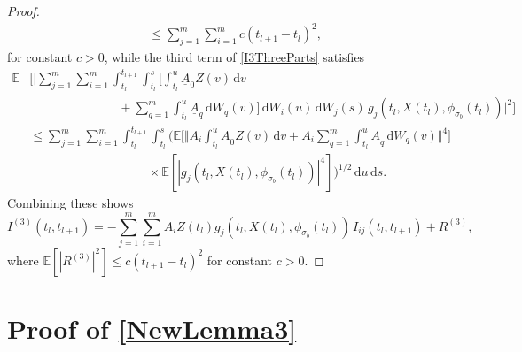 \documentclass[onefignum]{siamart250211}
\providecommand{\abs}[1]{\left|#1\right|}
\begin{document}
\begin{proof}
\begin{align*}
&\leqslant\sum_{j=1}^m\sum_{i=1}^mc(t_{l+1}-t_l)^2,
\end{align*}
for constant $c>0$, while the third term of \cref{I3ThreeParts} satisfies
\begin{align*}
\mathbb{E}&\bigg[\bigg|\sum_{j=1}^m\sum_{i=1}^m\int_{t_l}^{t_{l+1}}\int_{t_l}^s\bigg[\int_{t_l}^u\underline{A}_0Z(v)\,\mathrm{d}v\\
&\hspace{3cm}+\sum_{q=1}^m\int_{t_l}^u\underline{A}_q\,\mathrm{d}W_q(v)\bigg]\,\mathrm{d}W_i(u)\,\mathrm{d}W_j(s)\,g_j(t_l,X(t_l),\phi_{\sigma_b}(t_l))\bigg|^2\bigg]\\
&\leqslant\sum_{j=1}^m\sum_{i=1}^m\int_{t_l}^{t_{l+1}}\int_{t_l}^s\bigg(\mathbb{E}\bigg[\bigg\Vert A_i\int_{t_l}^u\underline{A}_0Z(v)\,\mathrm{d}v+A_i\sum_{q=1}^m\int_{t_l}^u\underline{A}_q\,\mathrm{d}W_q(v)\bigg\Vert^4\bigg]\\
&\hspace{4cm}\times\mathbb{E}\left[\abs{g_j(t_l,X(t_l),\phi_{\sigma_b}(t_l))}^4\right]\bigg)^{1/2}\,\mathrm{d}u\,\mathrm{d}s.
\end{align*}
Combining these shows
\begin{equation}I^{(3)}(t_l,t_{l+1})=-\sum_{j=1}^m\sum_{i=1}^mA_iZ(t_l)g_j(t_l,X(t_l),\phi_{\sigma_b}(t_l))\,I_{ij}(t_l,t_{l+1})+R^{(3)},\end{equation}
where $\mathbb{E}[\abs{R^{(3)}}^2]\leqslant c(t_{l+1}-t_l)^2$ for constant $c>0$.
\end{proof}


\section[Taylor expansions for Magnus approximations]{Proof of \cref{NewLemma3}}\label{ProofofNewLemma3}
\end{document}
